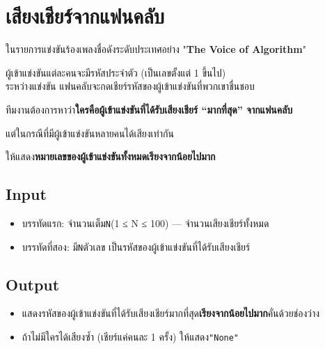 \documentclass{article}
\begin{document}
\section*{เสียงเชียร์จากแฟนคลับ}

ในรายการแข่งขันร้องเพลงชื่อดังระดับประเทศอย่าง "\textbf{The Voice of Algorithm}"

ผู้เข้าแข่งขันแต่ละคนจะมีรหัสประจำตัว (เป็นเลขตั้งแต่ 1 ขึ้นไป)\\

ระหว่างแข่งขัน แฟนคลับจะกดเชียร์รหัสของผู้เข้าแข่งขันที่พวกเขาชื่นชอบ



ทีมงานต้องการหาว่า\textbf{ใครคือผู้เข้าแข่งขันที่ได้รับเสียงเชียร์ ``มากที่สุด'' จากแฟนคลับ}



แต่ในกรณีที่มีผู้เข้าแข่งขันหลายคนได้เสียงเท่ากัน

ให้แสดง\textbf{หมายเลขของผู้เข้าแข่งขันทั้งหมดเรียงจากน้อยไปมาก}



\subsection*{Input}
\begin{itemize}

\item

  บรรทัดแรก: จำนวนเต็ม\texttt{N}(1 ≤ N ≤ 100) --- จำนวนเสียงเชียร์ทั้งหมด

\item

  บรรทัดที่สอง: มี\texttt{N}ตัวเลข เป็นรหัสของผู้เข้าแข่งขันที่ได้รับเสียงเชียร์

\end{itemize}



\subsection*{Output}
\begin{itemize}

\item

  แสดงรหัสของผู้เข้าแข่งขันที่ได้รับเสียงเชียร์มากที่สุด\textbf{เรียงจากน้อยไปมาก}คั่นด้วยช่องว่าง

\item

  ถ้าไม่มีใครได้เสียงซ้ำ (เชียร์แค่คนละ 1 ครั้ง) ให้แสดง\texttt{"None"}

\end{itemize}
\end{document}

